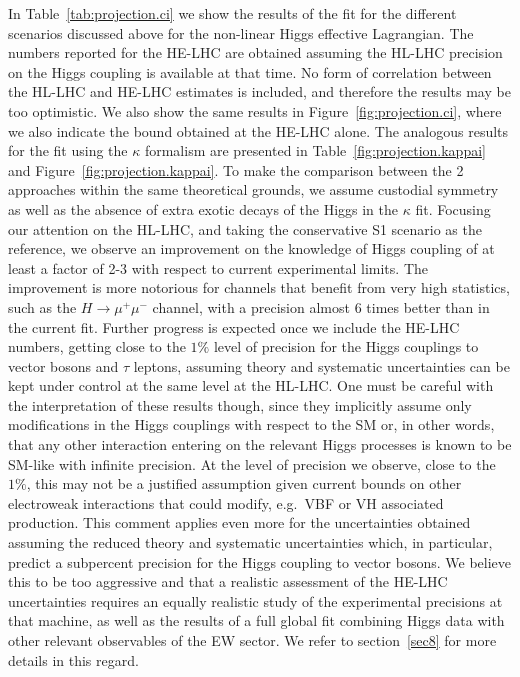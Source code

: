 In Table~\ref{tab:projection.ci} we show the results of the fit for the different scenarios discussed above for the non-linear Higgs effective Lagrangian. The numbers reported for the HE-LHC are obtained assuming the HL-LHC precision on the Higgs coupling is available at that time. No form of correlation between the HL-LHC and HE-LHC estimates is included, and therefore the 
results may be too optimistic. We also show the same results in Figure~\ref{fig:projection.ci}, where we also indicate the bound obtained
at the HE-LHC alone. The analogous results for the fit using the $\kappa$ formalism are presented in Table~\ref{fig:projection.kappai} and Figure~\ref{fig:projection.kappai}. To make the comparison between the 2 approaches within the same theoretical grounds, we assume custodial symmetry as well as the absence of extra exotic decays of the Higgs in the $\kappa$ fit.
Focusing our attention on the HL-LHC, and taking the conservative S1 scenario as the reference, we observe an improvement on the knowledge of Higgs coupling of at least a factor of 2-3 with respect to current experimental limits. The improvement is more notorious for channels that benefit from very high statistics, such as the $H\to \mu^+ \mu^-$ channel, with a precision almost $6$ times better than in the current fit. Further progress is expected once we include the HE-LHC numbers, getting close to the $1\%$ level of precision for the Higgs couplings to vector bosons and $\tau$ leptons, assuming theory and systematic uncertainties can be kept under control at the same level at the HL-LHC.  One must be careful with the interpretation of these results though, since they implicitly assume only modifications in the Higgs couplings with respect to the SM or, in other words, that any other interaction entering on the relevant Higgs processes is known to be SM-like with infinite precision. At the level of precision we observe, close to the $1\%$, this may not be a justified assumption given current bounds on other electroweak interactions that could modify, e.g.~VBF or VH associated production. This comment applies even more for the uncertainties obtained assuming the reduced theory and systematic uncertainties which, in particular, predict a subpercent precision for the Higgs coupling to vector bosons. We believe this to be too aggressive and that a realistic assessment of the HE-LHC uncertainties requires an equally realistic study of the experimental precisions at that machine, as well as the results of a full global fit combining Higgs data with other relevant observables of the EW sector. We refer to section~\ref{sec8} for more details in this regard.

